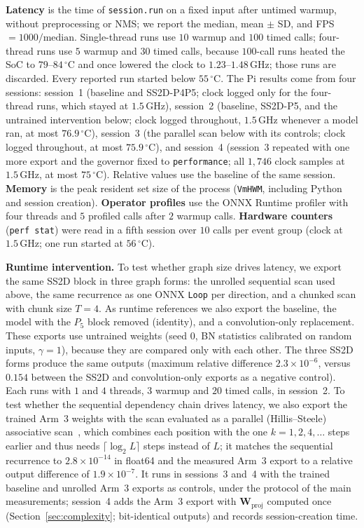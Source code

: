 \textbf{Latency} is the time of \texttt{session.run} on a fixed input after untimed warmup, without preprocessing or NMS; we report the median, mean $\pm$ SD, and FPS $= 1000/\text{median}$. Single-thread runs use $10$ warmup and $100$ timed calls; four-thread runs use $5$ warmup and $30$ timed calls, because $100$-call runs heated the SoC to $79$--$84\,^{\circ}$C and once lowered the clock to $1.23$--$1.48$\,GHz; those runs are discarded. Every reported run started below $55\,^{\circ}$C. The Pi results come from four sessions: session~1 (baseline and SS2D-P4P5; clock logged only for the four-thread runs, which stayed at $1.5$\,GHz), session~2 (baseline, SS2D-P5, and the untrained intervention below; clock logged throughout, $1.5$\,GHz whenever a model ran, at most $76.9\,^{\circ}$C), session~3 (the parallel scan below with its controls; clock logged throughout, at most $75.9\,^{\circ}$C), and session~4 (session~3 repeated with one more export and the governor fixed to \texttt{performance}; all $1{,}746$ clock samples at $1.5$\,GHz, at most $75\,^{\circ}$C). Relative values use the baseline of the same session. \textbf{Memory} is the peak resident set size of the process (\texttt{VmHWM}, including Python and session creation). \textbf{Operator profiles} use the ONNX Runtime profiler with four threads and $5$ profiled calls after $2$ warmup calls. \textbf{Hardware counters} (\texttt{perf stat}) were read in a fifth session over $10$ calls per event group (clock at $1.5$\,GHz; one run started at $56\,^{\circ}$C).

\textbf{Runtime intervention.} To test whether graph size drives latency, we export the same SS2D block in three graph forms: the unrolled sequential scan used above, the same recurrence as one ONNX \texttt{Loop} per direction, and a chunked scan with chunk size $T = 4$. As runtime references we also export the baseline, the model with the $P_5$ block removed (identity), and a convolution-only replacement. These exports use untrained weights (seed $0$, BN statistics calibrated on random inputs, $\gamma = 1$), because they are compared only with each other. The three SS2D forms produce the same outputs (maximum relative difference $2.3 \times 10^{-6}$, versus $0.154$ between the SS2D and convolution-only exports as a negative control). Each runs with $1$ and $4$ threads, $3$ warmup and $20$ timed calls, in session~2. To test whether the sequential dependency chain drives latency, we also export the trained Arm~3 weights with the scan evaluated as a parallel (Hillis--Steele) associative scan~\cite{blelloch1990prefix}, which combines each position with the one $k = 1, 2, 4, \dots$ steps earlier and thus needs $\lceil \log_2 L \rceil$ steps instead of $L$; it matches the sequential recurrence to $2.8 \times 10^{-14}$ in float64 and the measured Arm~3 export to a relative output difference of $1.9 \times 10^{-7}$. It runs in sessions~3 and~4 with the trained baseline and unrolled Arm~3 exports as controls, under the protocol of the main measurements; session~4 adds the Arm~3 export with $\mathbf{W}_{\text{proj}}$ computed once (Section~\ref{sec:complexity}; bit-identical outputs) and records session-creation time.
